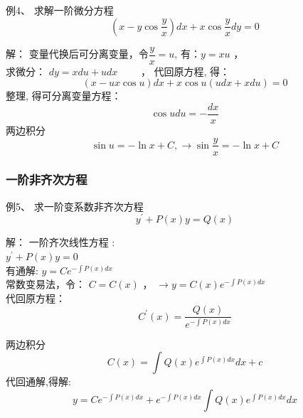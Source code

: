 \begin{frame}
\begin{exampleblock} {例4、	求解一阶微分方程}
	\begin{equation*}
	\left(x-y \cos \frac{y}{x}\right) d x+x \cos \frac{y}{x} d y=0
	\end{equation*}
\end{exampleblock} 	
\alert{解：} 变量代换后可分离变量，令$\dfrac{y}{x}=u$, 有：$y=xu$ ， \\ 
		求微分：	$d y=x d u+u d x$ ~~~~， 
		代回原方程, 得：
		\begin{equation*}
			(x-u x \cos u) d x+x \cos u(u d x+x d u)=0
		\end{equation*}	
		整理, 得可分离变量方程：
		\begin{equation*}
			\cos udu=-\frac{dx}{x}
		\end{equation*}	
		两边积分
		\begin{equation*}
			\sin u=-\ln x+C, \to  \sin \frac{y}{x}=-\ln x+C
		\end{equation*}	
\end{frame}


\begin{frame}
	\frametitle{一阶非齐次方程}
	\begin{exampleblock} {例5、	求一阶变系数非齐次方程}
	\begin{equation*}
		y^{\prime}+P(x) y=Q(x)
	\end{equation*}
	\end{exampleblock} 
	\alert{解：} 一阶齐次线性方程 :\\
		$ y^{\prime}+P(x) y=0$  \\ 
		有通解:	{\large 	$y=Ce^{-\int P(x)dx}$}\\	\vspace{0.3cm}
		常数变易法，令： $C=C(x)$ ，	{\large 	$ \to y=C(x)e^{-\int P(x)dx}$} \\ 
		代回原方程：
		\begin{equation*}
			C^{\prime}(x)=\frac {Q(x)} {e^{-\int P(x)dx}}
		\end{equation*}	
\end{frame}

\begin{frame}	
		两边积分
		\begin{equation*}
			C(x)=\int Q(x)e^{\int P(x)dx} dx+c 
		\end{equation*}	
		代回通解,得解:
		\begin{equation*}
			y=Ce^{-\int P(x)dx}+e^{-\int P(x)dx}\int Q(x)e^{\int P(x)dx} dx
		\end{equation*}	
\end{frame}

